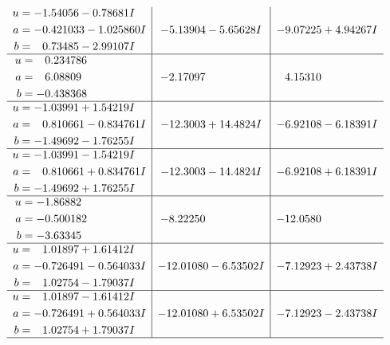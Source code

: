 \documentclass[1p]{elsarticle_modified}
\theoremstyle{definition}
\begin{document}
$$\begin{array}{c|c|c}
\begin{aligned}
u &= -1.54056 - 0.78681 I \\
a &= -0.421033 - 1.025860 I \\
b &= \phantom{-}0.73485 - 2.99107 I\end{aligned}
 & -5.13904 - 5.65628 I & -9.07225 + 4.94267 I \\ \hline\begin{aligned}
u &= \phantom{-}0.234786\phantom{ +0.000000I} \\
a &= \phantom{-}6.08809\phantom{ +0.000000I} \\
b &= -0.438368\phantom{ +0.000000I}\end{aligned}
 & -2.17097\phantom{ +0.000000I} & \phantom{-}4.15310\phantom{ +0.000000I} \\ \hline\begin{aligned}
u &= -1.03991 + 1.54219 I \\
a &= \phantom{-}0.810661 - 0.834761 I \\
b &= -1.49692 - 1.76255 I\end{aligned}
 & -12.3003 + 14.4824 I & -6.92108 - 6.18391 I \\ \hline\begin{aligned}
u &= -1.03991 - 1.54219 I \\
a &= \phantom{-}0.810661 + 0.834761 I \\
b &= -1.49692 + 1.76255 I\end{aligned}
 & -12.3003 - 14.4824 I & -6.92108 + 6.18391 I \\ \hline\begin{aligned}
u &= -1.86882\phantom{ +0.000000I} \\
a &= -0.500182\phantom{ +0.000000I} \\
b &= -3.63345\phantom{ +0.000000I}\end{aligned}
 & -8.22250\phantom{ +0.000000I} & -12.0580\phantom{ +0.000000I} \\ \hline\begin{aligned}
u &= \phantom{-}1.01897 + 1.61412 I \\
a &= -0.726491 - 0.564033 I \\
b &= \phantom{-}1.02754 - 1.79037 I\end{aligned}
 & -12.01080 - 6.53502 I & -7.12923 + 2.43738 I \\ \hline\begin{aligned}
u &= \phantom{-}1.01897 - 1.61412 I \\
a &= -0.726491 + 0.564033 I \\
b &= \phantom{-}1.02754 + 1.79037 I\end{aligned}
 & -12.01080 + 6.53502 I & -7.12923 - 2.43738 I\\
 \hline 
 \end{array}$$\newpage\newpage\renewcommand{\arraystretch}{1}
\end{document}
